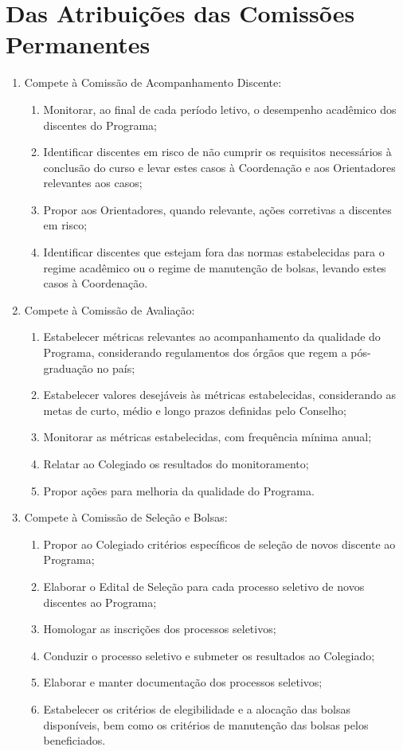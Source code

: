 \documentclass{article}
\newcommand{\grupoMenor}{Colegiado\xspace}
\newcommand{\grupoMaior}{Conselho\xspace}
\begin{document}
\section{Das Atribuições das Comissões Permanentes}
\begin{enumerate}
	\item Compete à Comissão de Acompanhamento Discente:
	\begin{enumerate}[label=\Roman*]
		\item Monitorar, ao final de cada período letivo, o desempenho acadêmico dos discentes do Programa;
		\item Identificar discentes em risco de não cumprir os requisitos necessários à conclusão do curso e levar estes casos à Coordenação e aos Orientadores relevantes aos casos;
		\item Propor aos Orientadores, quando relevante, ações corretivas a discentes em risco;
		\item Identificar discentes que estejam fora das normas estabelecidas para o regime acadêmico ou o regime de manutenção de bolsas, levando estes casos à Coordenação.
	\end{enumerate}

	\item Compete à Comissão de Avaliação:
	\begin{enumerate}[label=\Roman*]
		\item Estabelecer métricas relevantes ao acompanhamento da qualidade do Programa, considerando regulamentos dos órgãos que regem a pós-graduação no país;
		\item Estabelecer valores desejáveis às métricas estabelecidas, considerando as metas de curto, médio e longo prazos definidas pelo \grupoMaior;
		\item Monitorar as métricas estabelecidas, com frequência mínima anual;
		\item Relatar ao \grupoMenor os resultados do monitoramento;
		\item Propor ações para melhoria da qualidade do Programa.
	\end{enumerate}

	\item Compete à Comissão de Seleção e Bolsas:
	\begin{enumerate}[label=\Roman*]
		\item Propor ao \grupoMenor critérios específicos de seleção de novos discente ao Programa;
		\item Elaborar o Edital de Seleção para cada processo seletivo de novos discentes ao Programa;
		\item Homologar as inscrições dos processos seletivos;
		\item Conduzir o processo seletivo e submeter os resultados ao \grupoMenor;
		\item Elaborar e manter documentação dos processos seletivos;
		\item Estabelecer os critérios de elegibilidade e a alocação das bolsas disponíveis, bem como os critérios de manutenção das bolsas pelos beneficiados.
	\end{enumerate}
\end{enumerate}
\end{document}

